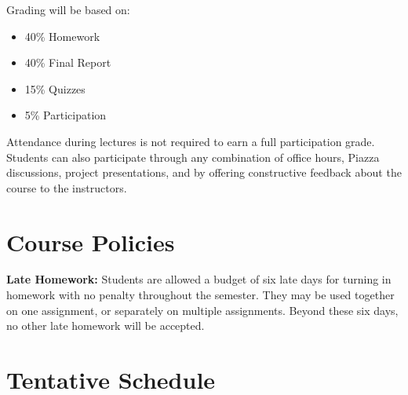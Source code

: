 \documentclass[11pt,letterpaper]{article}
\begin{document}
Grading will be based on:
\begin{itemize}
	\item 40\% Homework
	\item 40\% Final Report
	\item 15\% Quizzes
	\item 5\% Participation
\end{itemize}
Attendance during lectures is not required to earn a full participation grade. Students can also participate through any combination of office hours, Piazza discussions, project presentations, and by offering constructive feedback about the course to the instructors.


\section*{Course Policies}

\textbf{Late Homework:} Students are allowed a budget of six late days for turning in homework with no penalty throughout the semester. They may be used together on one assignment, or separately on multiple assignments. Beyond these six days, no other late homework will be accepted.

\section*{Tentative Schedule}
\end{document}
